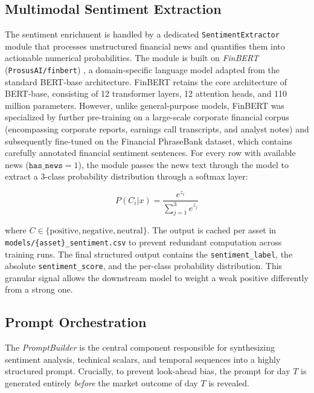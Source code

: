     \subsection{Multimodal Sentiment Extraction}
    The sentiment enrichment is handled by a dedicated \texttt{SentimentExtractor} module that processes unstructured financial news and quantifies them into actionable numerical probabilities. The module is built on \textit{FinBERT} (\texttt{ProsusAI/finbert}) \cite{araci2019finbert}, a domain-specific language model adapted from the standard BERT-base architecture. FinBERT retains the core architecture of BERT-base, consisting of 12 transformer layers, 12 attention heads, and 110 million parameters. However, unlike general-purpose models, FinBERT was specialized by further pre-training on a large-scale corporate financial corpus (encompassing corporate reports, earnings call transcripts, and analyst notes) and subsequently fine-tuned on the Financial PhraseBank dataset, which contains carefully annotated financial sentiment sentences. For every row with available news ($\texttt{has\_news}=1$), the module passes the news text through the model to extract a 3-class probability distribution through a softmax layer:
    
    \begin{equation}
        P(C_i | x) = \frac{e^{z_i}}{\sum_{j=1}^{3} e^{z_j}}
    \end{equation}
    
    where $C \in \{\text{positive}, \text{negative}, \text{neutral}\}$. The output is cached per asset in \texttt{models/\{asset\}\_sentiment.csv} to prevent redundant computation across training runs. The final structured output contains the \texttt{sentiment\_label}, the absolute \texttt{sentiment\_score}, and the per-class probability distribution. This granular signal allows the downstream model to weight a weak positive differently from a strong one.

    \subsection{Prompt Orchestration}
    The \textit{PromptBuilder} is the central component responsible for synthesizing sentiment analysis, technical scalars, and temporal sequences into a highly structured prompt. Crucially, to prevent look-ahead bias, the prompt for day $T$ is generated entirely \textit{before} the market outcome of day $T$ is revealed.


